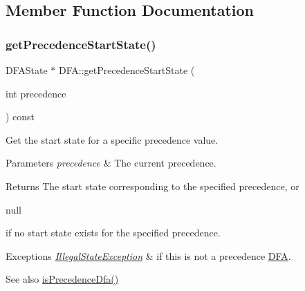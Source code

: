 \subsection{Member Function Documentation}
\mbox{\label{classantlr4_1_1dfa_1_1DFA_a6e0d2aca83d6cb0d155d971594c8dc7f}} 
\subsubsection{\texorpdfstring{get\+Precedence\+Start\+State()}{getPrecedenceStartState()}}
{\footnotesize\ttfamily D\+F\+A\+State $\ast$ D\+F\+A\+::get\+Precedence\+Start\+State (\begin{DoxyParamCaption}\item[{int}]{precedence }\end{DoxyParamCaption}) const}

Get the start state for a specific precedence value.


\begin{DoxyParams}{Parameters}
{\em precedence} & The current precedence. \\
\hline
\end{DoxyParams}
\begin{DoxyReturn}{Returns}
The start state corresponding to the specified precedence, or 
\begin{DoxyCode}
null 
\end{DoxyCode}
 if no start state exists for the specified precedence.
\end{DoxyReturn}

\begin{DoxyExceptions}{Exceptions}
{\em \hyperlink{classantlr4_1_1IllegalStateException}{Illegal\+State\+Exception}} & if this is not a precedence \hyperlink{classantlr4_1_1dfa_1_1DFA}{D\+FA}. \\
\hline
\end{DoxyExceptions}
\begin{DoxySeeAlso}{See also}
\hyperlink{classantlr4_1_1dfa_1_1DFA_a16f04e1d91f059b882505aff2174a1e1}{is\+Precedence\+Dfa()} 
\end{DoxySeeAlso}
\mbox{\label{classantlr4_1_1dfa_1_1DFA_a16f04e1d91f059b882505aff2174a1e1}} 
